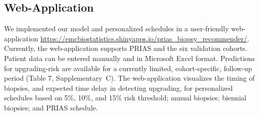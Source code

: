 \subsection{Web-Application}
We implemented our model and personalized schedules in a user-friendly web-application \url{https://emcbiostatistics.shinyapps.io/prias_biopsy_recommender/}. Currently, the web-application supports PRIAS and the six validation cohorts. Patient data can be entered manually and in Microsoft Excel format. Predictions for upgrading-risk are available for a currently limited, cohort-specific, follow-up period (Table 7, Supplementary~C). The web-application visualizes the timing of biopsies, and expected time delay in detecting upgrading, for personalized schedules based on 5\%, 10\%, and 15\% risk threshold; annual biopsies; biennial biopsies; and PRIAS schedule.